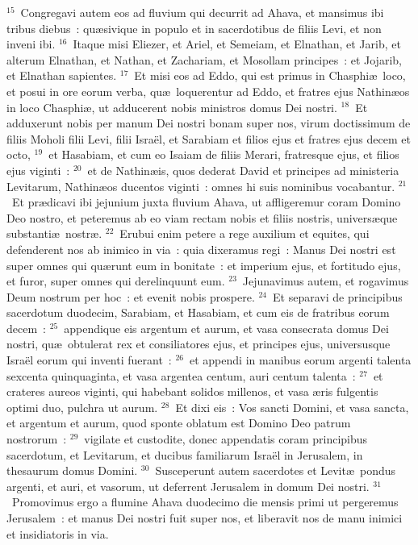 ${}^{15}$~Congregavi autem eos ad fluvium qui decurrit ad Ahava, et mansimus ibi tribus diebus~: qu\ae sivique in populo et in sacerdotibus de filiis Levi, et non inveni ibi.
${}^{16}$~Itaque misi Eliezer, et Ariel, et Semeiam, et Elnathan, et Jarib, et alterum Elnathan, et Nathan, et Zachariam, et Mosollam principes~: et Jojarib, et Elnathan sapientes.
${}^{17}$~Et misi eos ad Eddo, qui est primus in Chasphi\ae\ loco, et posui in ore eorum verba, qu\ae\ loquerentur ad Eddo, et fratres ejus Nathin\ae os in loco Chasphi\ae , ut adducerent nobis ministros domus Dei nostri.
${}^{18}$~Et adduxerunt nobis per manum Dei nostri bonam super nos, virum doctissimum de filiis Moholi filii Levi, filii Isra\"el, et Sarabiam et filios ejus et fratres ejus decem et octo,
${}^{19}$~et Hasabiam, et cum eo Isaiam de filiis Merari, fratresque ejus, et filios ejus viginti~:
${}^{20}$~et de Nathin\ae is, quos dederat David et principes ad ministeria Levitarum, Nathin\ae os ducentos viginti~: omnes hi suis nominibus vocabantur.
${}^{21}$~Et pr\ae dicavi ibi jejunium juxta fluvium Ahava, ut affligeremur coram Domino Deo nostro, et peteremus ab eo viam rectam nobis et filiis nostris, univers\ae que substanti\ae\ nostr\ae .
${}^{22}$~Erubui enim petere a rege auxilium et equites, qui defenderent nos ab inimico in via~: quia dixeramus regi~: Manus Dei nostri est super omnes qui qu\ae runt eum in bonitate~: et imperium ejus, et fortitudo ejus, et furor, super omnes qui derelinquunt eum.
${}^{23}$~Jejunavimus autem, et rogavimus Deum nostrum per hoc~: et evenit nobis prospere.
${}^{24}$~Et separavi de principibus sacerdotum duodecim, Sarabiam, et Hasabiam, et cum eis de fratribus eorum decem~:
${}^{25}$~appendique eis argentum et aurum, et vasa consecrata domus Dei nostri, qu\ae\ obtulerat rex et consiliatores ejus, et principes ejus, universusque Isra\"el eorum qui inventi fuerant~:
${}^{26}$~et appendi in manibus eorum argenti talenta sexcenta quinquaginta, et vasa argentea centum, auri centum talenta~:
${}^{27}$~et crateres aureos viginti, qui habebant solidos millenos, et vasa \ae ris fulgentis optimi duo, pulchra ut aurum.
${}^{28}$~Et dixi eis~: Vos sancti Domini, et vasa sancta, et argentum et aurum, quod sponte oblatum est Domino Deo patrum nostrorum~:
${}^{29}$~vigilate et custodite, donec appendatis coram principibus sacerdotum, et Levitarum, et ducibus familiarum Isra\"el in Jerusalem, in thesaurum domus Domini.
${}^{30}$~Susceperunt autem sacerdotes et Levit\ae\ pondus argenti, et auri, et vasorum, ut deferrent Jerusalem in domum Dei nostri.
${}^{31}$~Promovimus ergo a flumine Ahava duodecimo die mensis primi ut pergeremus Jerusalem~: et manus Dei nostri fuit super nos, et liberavit nos de manu inimici et insidiatoris in via.


